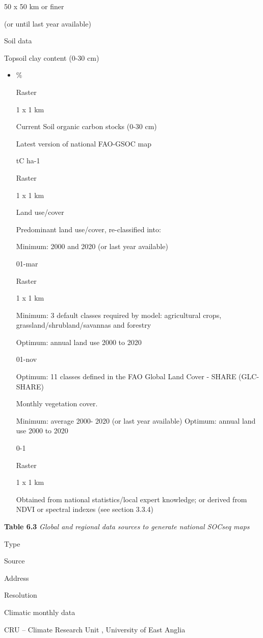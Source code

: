 \documentclass[
  10pt,
  b5paper,
]{book}
\begin{document}
50 x 50 km or finer

(or until last year available)

Soil data

Topsoil clay content (0-30 cm)

\begin{itemize}
\item
  \%

  Raster

  1 x 1 km

  Current Soil organic carbon stocks (0-30 cm)

  Latest version of national FAO-GSOC map

  tC ha-1

  Raster

  1 x 1 km

  Land use/cover

  Predominant land use/cover, re-classified into:

  Minimum: 2000 and 2020 (or last year available)

  01-mar

  Raster

  1 x 1 km

  Minimum: 3 default classes required by model: agricultural crops, grassland/shrubland/savannas and forestry

  Optimum: annual land use 2000 to 2020

  01-nov

  Optimum: 11 classes defined in the FAO Global Land Cover - SHARE (GLC-SHARE)

  Monthly vegetation cover.

  Minimum: average 2000- 2020 (or last year available) Optimum: annual land use 2000 to 2020

  0-1

  Raster

  1 x 1 km

  Obtained from national statistics/local expert knowledge; or derived from NDVI or spectral indexes (see section 3.3.4)
\end{itemize}

\textbf{Table 6.3} \emph{Global and regional data sources to generate national SOCseq maps}

Type

Source

Address

Resolution

Climatic monthly data

CRU -- Climate Research Unit , University of East Anglia
\end{document}
